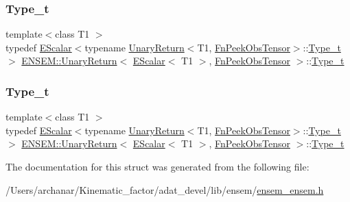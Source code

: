 \subsubsection{\texorpdfstring{Type\_t}{Type\_t}\hspace{0.1cm}{\footnotesize\ttfamily [1/2]}}
{\footnotesize\ttfamily template$<$class T1 $>$ \\
typedef \mbox{\hyperlink{classENSEM_1_1EScalar}{E\+Scalar}}$<$typename \mbox{\hyperlink{structENSEM_1_1UnaryReturn}{Unary\+Return}}$<$T1, \mbox{\hyperlink{structENSEM_1_1FnPeekObsTensor}{Fn\+Peek\+Obs\+Tensor}}$>$\+::\mbox{\hyperlink{structENSEM_1_1UnaryReturn_3_01EScalar_3_01T1_01_4_00_01FnPeekObsTensor_01_4_aebe42fb1bfefa3588cabc7286faabe45}{Type\+\_\+t}}$>$ \mbox{\hyperlink{structENSEM_1_1UnaryReturn}{E\+N\+S\+E\+M\+::\+Unary\+Return}}$<$ \mbox{\hyperlink{classENSEM_1_1EScalar}{E\+Scalar}}$<$ T1 $>$, \mbox{\hyperlink{structENSEM_1_1FnPeekObsTensor}{Fn\+Peek\+Obs\+Tensor}} $>$\+::\mbox{\hyperlink{structENSEM_1_1UnaryReturn_3_01EScalar_3_01T1_01_4_00_01FnPeekObsTensor_01_4_aebe42fb1bfefa3588cabc7286faabe45}{Type\+\_\+t}}}

\mbox{\label{structENSEM_1_1UnaryReturn_3_01EScalar_3_01T1_01_4_00_01FnPeekObsTensor_01_4_aebe42fb1bfefa3588cabc7286faabe45}} 
\subsubsection{\texorpdfstring{Type\_t}{Type\_t}\hspace{0.1cm}{\footnotesize\ttfamily [2/2]}}
{\footnotesize\ttfamily template$<$class T1 $>$ \\
typedef \mbox{\hyperlink{classENSEM_1_1EScalar}{E\+Scalar}}$<$typename \mbox{\hyperlink{structENSEM_1_1UnaryReturn}{Unary\+Return}}$<$T1, \mbox{\hyperlink{structENSEM_1_1FnPeekObsTensor}{Fn\+Peek\+Obs\+Tensor}}$>$\+::\mbox{\hyperlink{structENSEM_1_1UnaryReturn_3_01EScalar_3_01T1_01_4_00_01FnPeekObsTensor_01_4_aebe42fb1bfefa3588cabc7286faabe45}{Type\+\_\+t}}$>$ \mbox{\hyperlink{structENSEM_1_1UnaryReturn}{E\+N\+S\+E\+M\+::\+Unary\+Return}}$<$ \mbox{\hyperlink{classENSEM_1_1EScalar}{E\+Scalar}}$<$ T1 $>$, \mbox{\hyperlink{structENSEM_1_1FnPeekObsTensor}{Fn\+Peek\+Obs\+Tensor}} $>$\+::\mbox{\hyperlink{structENSEM_1_1UnaryReturn_3_01EScalar_3_01T1_01_4_00_01FnPeekObsTensor_01_4_aebe42fb1bfefa3588cabc7286faabe45}{Type\+\_\+t}}}



The documentation for this struct was generated from the following file\+:\begin{DoxyCompactItemize}
\item 
/\+Users/archanar/\+Kinematic\+\_\+factor/adat\+\_\+devel/lib/ensem/\mbox{\hyperlink{lib_2ensem_2ensem__ensem_8h}{ensem\+\_\+ensem.\+h}}\end{DoxyCompactItemize}
